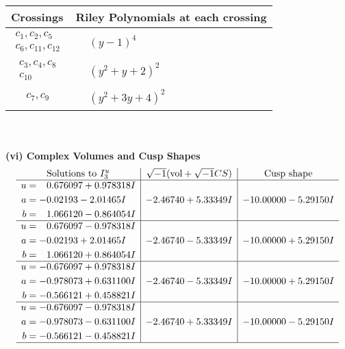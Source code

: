 \documentclass[1p]{elsarticle_modified}
\theoremstyle{definition}
\newcommand{\I}{\sqrt{-1}}
\begin{document}
\begin{tabular}{m{50pt}|m{274pt}}
Crossings & \hspace{64pt}Riley Polynomials at each crossing \\
\hline $$\begin{aligned}c_{1},c_{2},c_{5}\\c_{6},c_{11},c_{12}\end{aligned}$$&$\begin{aligned}
&(y-1)^4
\end{aligned}$\\
\hline $$\begin{aligned}c_{3},c_{4},c_{8}\\c_{10}\end{aligned}$$&$\begin{aligned}
&(y^2+y+2)^2
\end{aligned}$\\
\hline $$\begin{aligned}c_{7},c_{9}\end{aligned}$$&$\begin{aligned}
&(y^2+3 y+4)^2
\end{aligned}$\\
\hline
\end{tabular}\\~\\
\newpage\flushleft \textbf{(vi) Complex Volumes and Cusp Shapes}
$$\begin{array}{c|c|c}  
\text{Solutions to }I^u_{3}& \I (\text{vol} + \sqrt{-1}CS) & \text{Cusp shape}\\
 \hline 
\begin{aligned}
u &= \phantom{-}0.676097 + 0.978318 I \\
a &= -0.02193 - 2.01465 I \\
b &= \phantom{-}1.066120 - 0.864054 I\end{aligned}
 & -2.46740 + 5.33349 I & -10.00000 - 5.29150 I \\ \hline\begin{aligned}
u &= \phantom{-}0.676097 - 0.978318 I \\
a &= -0.02193 + 2.01465 I \\
b &= \phantom{-}1.066120 + 0.864054 I\end{aligned}
 & -2.46740 - 5.33349 I & -10.00000 + 5.29150 I \\ \hline\begin{aligned}
u &= -0.676097 + 0.978318 I \\
a &= -0.978073 + 0.631100 I \\
b &= -0.566121 + 0.458821 I\end{aligned}
 & -2.46740 - 5.33349 I & -10.00000 + 5.29150 I \\ \hline\begin{aligned}
u &= -0.676097 - 0.978318 I \\
a &= -0.978073 - 0.631100 I \\
b &= -0.566121 - 0.458821 I\end{aligned}
 & -2.46740 + 5.33349 I & -10.00000 - 5.29150 I\\
 \hline 
 \end{array}$$\newpage\newpage\renewcommand{\arraystretch}{1}
\end{document}
